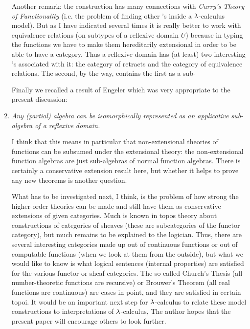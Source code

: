 \begin{enumerate}
Another remark: the construction has many connections with {\it Curry's Theory of
Functionality} (i.e. the problem of finding other \ccc's inside a $\lambda$-calculus model).
But as I have indicated several times it is really better to work with equivalence
relations (on subtypes of a reflexive domain $U$) because in typing the functions we have
to make them hereditarily extensional in order to be able to have a category. Thus a
reflexive domain has (at least) two interesting \ccc's associated with it: the category of
retracts and the category of equivalence relations. The second, by the way, contains the
first as a sub-\ccc\

Finally we recalled a result of Engeler which was very appropriate to the present
discussion:

\item {\it Any (partial) algebra can be isomorphically represented as an 
applicative sub-algebra of a reflexive domain.}

I think that this means in particular that non-extensional theories of functions can be
subsumed under the extensional theory: the non-extensional function algebras are just sub-algebras
of normal function algebras. There is certainly a conservative extension result
here, but whether it helps to prove any new theorems is another question.

What has to be investigated next, I think, is the problem of how strong the higher-order
theories can be made and still have them as conservative extensions of given categories.
Much is known in topos theory about constructions of categories of sheaves (these are
subcategories of the functor category), but much remains to be explained to the logician.
Thus, there are several interesting categories made up out of continuous functions or out
of computable functions (when we look at them from the outside), but what we would like to
know is what logical sentences (internal properties) are satisfied for the various functor
or sheaf categories. The so-called Church's Thesis (all number-theoretic functions are
recursive) or Brouwer's Theorem (all real functions are continuous) are cases in point,
and they are satisfied in certain topoi. It would be an important next step for
$\lambda$-calculus to relate these model constructions to interpretations of $\lambda$-calculus, The
author hopes that the present paper will encourage others to look further.

\end{enumerate}



